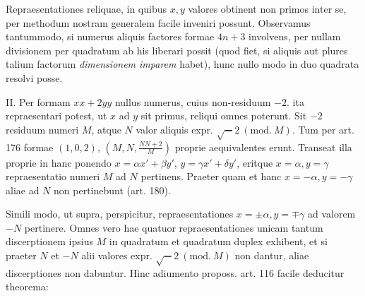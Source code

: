 Repraesentationes reliquae, in quibus $x,y$ valores obtinent non primos inter se, per methodum nostram generalem facile inveniri possunt. Observamus tantummodo, si numerus aliquis factores formae $4n+3$ involvens, per nullam divisionem per quadratum ab his liberari possit (quod fiet, si aliquis aut plures talium factorum \textit{dimensionem imparem} habet), hunc nullo modo in duo quadrata resolvi posse.

II. Per formam $xx+2yy$ nullus numerus, cuius non-residuum $-2$. ita repraesentari potest, ut $x$ ad $y$ sit primus, reliqui omnes poterunt. Sit $-2$ residuum numeri $M$, atque $N$ valor aliquis expr. $\surd-2\ (\mathrm{mod.}\ M)$. Tum per art. 176 formae $(1,0,2)$, $(M,N,\frac{NN+2}{M})$ proprie aequivalentes erunt. Transeat illa proprie in hanc ponendo $x=\alpha x'+\beta y'$, $y=\gamma x'+\delta y'$, eritque $x=\alpha,y=\gamma$ repraesentatio numeri $M$ ad $N$ pertinens. Praeter quam et hanc $x=-\alpha,y=-\gamma$ aliae ad $N$ non pertinebunt (art. 180).

Simili modo, ut supra, perspicitur, repraesentationes $x=\pm\alpha,y=\mp\gamma$ ad valorem $-N$ pertinere. Omnes vero hae quatuor repraesentationes unicam tantum discerptionem ipsius $M$ in quadratum et quadratum duplex exhibent, et si praeter $N$ et $-N$ alii valores expr. $\surd-2\ (\mathrm{mod.}\ M)$ non dantur, aliae discerptiones non dabuntur. Hinc adiumento proposs. art. 116 facile deducitur theorema:

